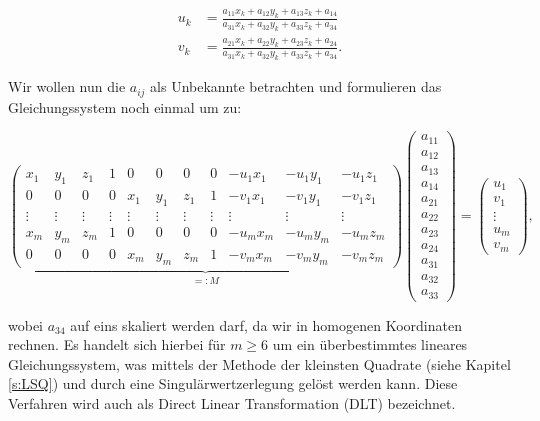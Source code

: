 \[
 \begin{aligned}
 u_k &= \frac{a_{11} x_k +a_{12}y_k + a_{13}z_k + a_{14}}{a_{31} x_k +a_{32}y_k + a_{33}z_k + a_{34}} \\
 v_k &= \frac{a_{21} x_k +a_{22}y_k + a_{23}z_k + a_{24}}{a_{31} x_k +a_{32}y_k + a_{33}z_k + a_{34}}.
 \end{aligned}
\]

Wir wollen nun die $a_{ij}$ als Unbekannte betrachten und formulieren das Gleichungssystem noch einmal um zu:

 \setcounter{MaxMatrixCols}{20}
\begin{equation}\label{eq:DLT}
\underbrace{\begin{pmatrix}
x_1 & y_1 & z_1 & 1 & 0 & 0 & 0 & 0 & -u_1 x_1 & -u_1 y_1 & -u_1z_1 \\
0 & 0 & 0 & 0 & x_1 & y_1 & z_1 & 1 & -v_1x_1 & -v_1y_1 & -v_1z_1 \\
\vdots & \vdots & \vdots & \vdots & \vdots & \vdots & \vdots & \vdots & \vdots & \vdots & \vdots\\
x_m & y_m & z_m & 1 & 0 & 0 & 0 & 0 & -u_m x_m & -u_m y_m & -u_m z_m \\
0 & 0 & 0 & 0 & x_m & y_m & z_m & 1 & -v_mx_m & -v_my_m & -v_mz_m
\end{pmatrix}}_{=:M}
\begin{pmatrix}
a_{11} \\ a_{12} \\ a_{13} \\ a_{14} \\ a_{21} \\ a_{22} \\ a_{23} \\ a_{24} \\ a_{31} \\ a_{32} \\ a_{33}
\end{pmatrix} =
\begin{pmatrix}
u_1 \\ v_1 \\ \vdots \\ u_m \\ v_m
\end{pmatrix},
\end{equation}

wobei $a_{34}$ auf eins skaliert werden darf, da wir in homogenen Koordinaten rechnen. Es handelt sich hierbei für $m \geq 6$ um ein überbestimmtes lineares Gleichungssystem, was mittels der Methode der kleinsten Quadrate (siehe Kapitel \ref{s:LSQ}) und durch eine Singulärwertzerlegung gelöst werden kann.
Diese Verfahren wird auch als Direct Linear Transformation (DLT) bezeichnet.


